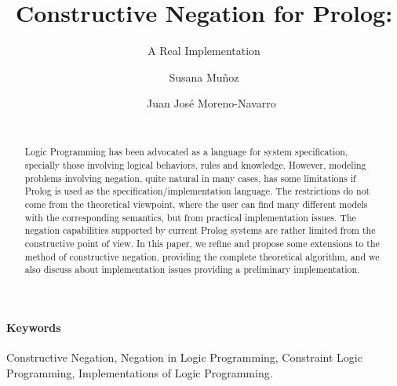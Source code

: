 \documentclass{llncs}
\begin{document}

\title{Constructive Negation for Prolog:}
\subtitle{A Real Implementation}

\author{~~Susana Mu\~{n}oz~~ \and ~~ Juan Jos\'{e} Moreno-Navarro \\
         ~~~~~~~~~~ }


\maketitle

\vspace{-12pt}

%



\begin{abstract}
  Logic Programming has been advocated as a language for system
  specification, specially those involving logical behaviors, rules
  and knowledge. However, modeling problems involving negation, quite
  natural in many cases, has some limitations if Prolog is used as the 
specification/implementation language. The restrictions do not
  come from the theoretical viewpoint, where the user can find many
  different models with the corresponding semantics, but from
  practical implementation issues.  The negation capabilities supported by
  current Prolog systems are rather limited from the constructive
  point of view.  In this paper, we refine and propose some extensions
  to the method of constructive negation, providing the complete
  theoretical algorithm, and we also discuss about implementation
  issues providing a preliminary implementation.
\end{abstract}

\paragraph{\bf Keywords}
Constructive Negation, Negation in Logic Programming, Constraint Logic
Programming, Implementations of Logic Programming.
\end{document}
